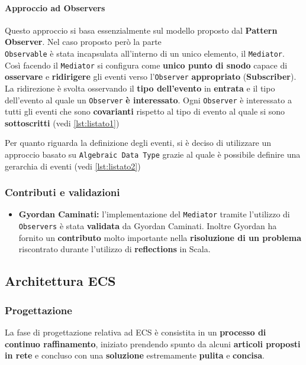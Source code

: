 \paragraph{Approccio ad Observers}
Questo approccio si basa essenzialmente sul modello proposto dal \textbf{Pattern Observer}. Nel caso proposto però la parte\\ { }\texttt{Observable} è stata incapsulata all'interno di un unico elemento, il \texttt{Mediator}. Così facendo il \texttt{Mediator} si configura come \textbf{unico punto di snodo} capace di \textbf{osservare} e \textbf{ridirigere} gli eventi verso l'\texttt{Observer} \textbf{appropriato} (\textbf{Subscriber}). La ridirezione è svolta osservando il \textbf{tipo dell'evento} in \textbf{entrata} e il tipo dell'evento al quale un \texttt{Observer} \textbf{è interessato}. Ogni \texttt{Observer} è interessato a tutti gli eventi che sono \textbf{covarianti} rispetto al tipo di evento al quale si sono \textbf{sottoscritti} (vedi \ref{lst:listato1})



Per quanto riguarda la definizione degli eventi, si è deciso di utilizzare un approccio basato su \texttt{Algebraic Data Type} grazie al quale è possibile definire una gerarchia di eventi (vedi \ref{lst:listato2})



\subsubsection{Contributi e validazioni}
\begin{itemize}
	\item{\textbf{Gyordan Caminati:}} l'implementazione del \texttt{Mediator} tramite l'utilizzo di \texttt{Observers} è stata \textbf{validata} da Gyordan Caminati. Inoltre Gyordan ha fornito un \textbf{contributo} molto importante nella \textbf{risoluzione di un problema} riscontrato durante l'utilizzo di \textbf{reflections} in Scala. 
\end{itemize}


\subsection{Architettura ECS}
\label{subsec:arc_ecs}
\subsubsection{Progettazione}
La fase di progettazione relativa ad ECS è consistita in un \textbf{processo di continuo raffinamento}, iniziato prendendo spunto da alcuni \textbf{articoli proposti in rete} e concluso con una \textbf{soluzione} estremamente \textbf{pulita} e \textbf{concisa}. 

